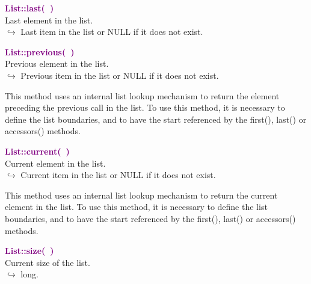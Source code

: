 
\textcolor{purple}{\textbf{List::last(~)}}\label{List::last()}\\
Last element in the list.\\ \hspace*{10mm}$\hookrightarrow$ Last item in the list or NULL if it does not exist.


\textcolor{purple}{\textbf{List::previous(~)}}\label{List::previous()}\\
Previous element in the list.\\ \hspace*{10mm}$\hookrightarrow$ Previous item in the list or NULL if it does not exist.

This method uses an internal list lookup mechanism to return the element preceding the previous call in the list.
To use this method, it is necessary to define the list boundaries, and to have the start referenced by the first(), last() or accessors() methods.

\textcolor{purple}{\textbf{List::current(~)}}\label{List::current()}\\
Current element in the list.\\ \hspace*{10mm}$\hookrightarrow$ Current item in the list or NULL if it does not exist.

This method uses an internal list lookup mechanism to return the current element in the list.
To use this method, it is necessary to define the list boundaries, and to have the start referenced by the first(), last() or accessors() methods.

\textcolor{purple}{\textbf{List::size(~)}}\label{List::size()}\\
Current size of the list.\\ \hspace*{10mm}$\hookrightarrow$ long.

